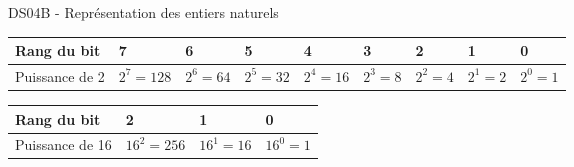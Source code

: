 \documentclass[a4paper,12pt,openany]{book}
\begin{document}
\newpage

\begin{center}\begin{large}
DS04B - Représentation des entiers naturels

\end{large}\end{center}



\renewcommand{\arraystretch}{1.4}
\begin{tabular}{|p{}|p{1.55cm}|p{1.4cm}|p{1.4cm}|p{1.4cm}|p{1.4cm}|p{1.4cm}|p{1.4cm}|p{1.4cm}|}
\hline
Rang du bit & 7 & 6 & 5 & 4 & 3 & 2 & 1 & 0 \\ \hline
Puissance de 2 & $2^7=128$ & $2^6=64$ & $2^5=32$ & $2^4=16$ & $2^3=8$ & $2^2=4$ & $2^1=2$ & $2^0=1$ \\ \hline

\end{tabular}


\medskip

\renewcommand{\arraystretch}{1.4}
\begin{tabular}{|p{3.5cm}|p{1.8cm}|p{1.8cm}|p{1.8cm}|}
\hline
Rang du bit & 2 & 1 & 0 \\ \hline
Puissance de 16 & $16^2=256$ & $16^1=16$ & $16^0=1$ \\ \hline

\end{tabular}

\bigskip
\end{document}
